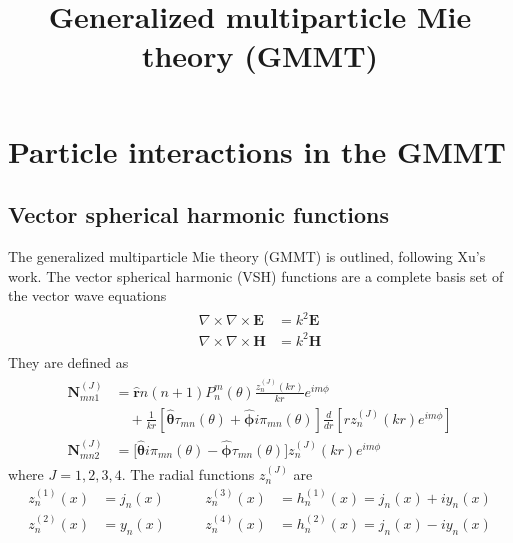 \documentclass[11pt]{article}
\title{Generalized multiparticle Mie theory (GMMT)}
\date{}
\author{}
\begin{document}
\maketitle
\tableofcontents

\section{Particle interactions in the GMMT}
\subsection{Vector spherical harmonic functions}

The generalized multiparticle Mie theory (GMMT) is outlined, following Xu's work. \cite{xu1995electromagnetic}
The vector spherical harmonic (VSH) functions are a complete basis set of the vector wave equations
\begin{align}
    \begin{split}
        \nabla \times \nabla \times \boldsymbol{E} &= k^2 \boldsymbol{E} \\
        \nabla \times \nabla \times \boldsymbol{H} &= k^2 \boldsymbol{H}
    \end{split}
\end{align}
They are defined as
\begin{align}
    \begin{split}
        \boldsymbol{N}_{mn1}^{(J)} &= 
        \boldsymbol{\hat r} n(n+1) P_n^m(\theta) \frac{z_n^{(J)}(kr)}{kr}e^{im\phi} \\
        &\quad + \frac{1}{kr} \left[ \boldsymbol{\hat \theta} \tau_{mn}(\theta) + \boldsymbol{\hat \phi} i\pi_{mn}(\theta) \right]
        \frac{d}{dr} \left[ rz_n^{(J)}(kr)e^{im\phi} \right] \\
        \boldsymbol{N}_{mn2}^{(J)} &= \big[
        \boldsymbol{\hat \theta} i\pi_{mn}(\theta) 
       -\boldsymbol{\hat \phi} \tau_{mn}(\theta) \big] z_n^{(J)}(kr) e^{im\phi} 
    \end{split}
\label{eqn:vsh_definition}
\end{align}
where $J= 1,2,3,4$. The radial functions $z_n^{(J)}$ are
\begin{equation}
\begin{align*}
    z_n^{(1)}(x) &= j_n(x)  \qquad&  z_n^{(3)}(x) &= h_n^{(1)}(x) = j_n(x) + iy_n(x)   \\
z_n^{(2)}(x) &= y_n(x)  \qquad&  z_n^{(4)}(x) &= h_n^{(2)}(x) = j_n(x) - iy_n(x)
\end{align*}
\end{equation}
\end{document}
